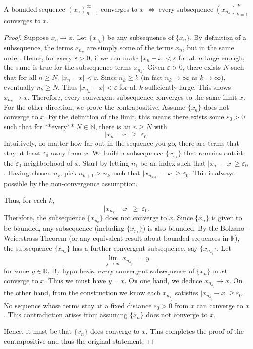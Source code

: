 \documentclass[../main.tex]{subfiles}
\begin{document}
    
    \begin{exercise}
    A bounded sequence $ (x_n)^\infty_{n=1}$ converges to $x$ $\iff$ every subsequence $ (x_{n_k})^\infty_{k = 1}$ converges to $x$.
    \end{exercise}
    
    \begin{proof}
Suppose \(x_n \to x\). Let \(\{x_{n_k}\}\) be any subsequence of \(\{x_n\}\). By definition of a subsequence, the terms \(x_{n_k}\) are simply some of the terms \(x_n\), but in the same order. Hence, for every \(\varepsilon > 0\), if we can make \(|x_n - x| < \varepsilon\) for all \(n\) large enough, the same is true for the subsequence terms \(x_{n_k}\). Given \(\varepsilon > 0\), there exists \(N\) such that for all \(n \ge N\), \(|x_n - x| < \varepsilon\). Since \(n_k \ge k\) (in fact \(n_k \to \infty\) as \(k \to \infty\)), eventually \(n_k \ge N\). Thus \(\bigl|x_{n_k} - x\bigr| < \varepsilon\) for all \(k\) sufficiently large. This shows \(x_{n_k} \to x\). Therefore, every convergent subsequence converges to the same limit \(x\).
\\ \indent For the other direction, we prove the contrapositive. Assume \(\{x_n\}\) does not converge to \(x\). By the definition of the limit, this means there exists some \(\varepsilon_0 > 0\) such that for **every** \(N\in\mathbb{N}\), there is an \(n \ge N\) with
\[
  \bigl|x_n - x\bigr| \;\ge\; \varepsilon_0.
\]
Intuitively, no matter how far out in the sequence you go, there are terms that stay at least \(\varepsilon_0\)-away from \(x\). We build a subsequence \(\{x_{n_k}\}\) that remains outside the \(\varepsilon_0\)-neighborhood of \(x\). Start by letting \(n_1\) be an index such that \(\bigl|x_{n_1} - x\bigr| \ge \varepsilon_0\). Having chosen \(n_k\), pick \(n_{k+1} > n_k\) such that \(\bigl|x_{n_{k+1}} - x\bigr| \ge \varepsilon_0\).  
This is always possible by the non-convergence assumption.

Thus, for each \(k\),
\[
  \bigl|x_{n_k} - x\bigr| \;\ge\; \varepsilon_0.
\]
Therefore, the subsequence \(\{x_{n_k}\}\) does not converge to \(x\). Since \(\{x_n\}\) is given to be bounded, any subsequence (including \(\{x_{n_k}\}\)) is also bounded. By the Bolzano–Weierstrass Theorem (or any equivalent result about bounded sequences in \(\mathbb{R}\)), the subsequence \(\{x_{n_k}\}\) has a further convergent subsequence, say \(\{x_{n_{k_j}}\}\). Let
\[
  \lim_{j \to \infty} x_{n_{k_j}} \;=\; y
\]
for some \(y \in \mathbb{R}\). By hypothesis, every convergent subsequence of \(\{x_n\}\) must converge to \(x\). Thus we must have \(y = x\).  On one hand, we deduce \(x_{n_{k_j}} \to x\). On the other hand, from the construction we know each \(x_{n_{k_j}}\) satisfies \(\bigl|x_{n_{k_j}} - x\bigr| \ge \varepsilon_0\). No sequence whose terms stay at a fixed distance \(\varepsilon_0>0\) from \(x\) can converge to \(x\). This contradiction arises from assuming \(\{x_n\}\) does not converge to \(x\).

Hence, it must be that \(\{x_n\}\) does converge to \(x\). This completes the proof of the contrapositive and thus the original statement.
\end{proof}
    
\end{document}
